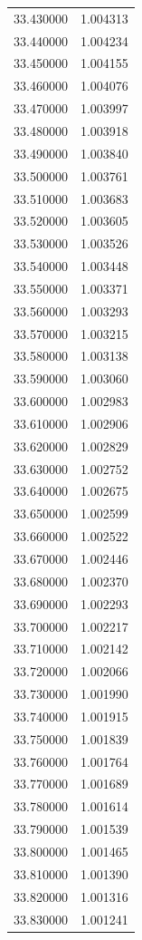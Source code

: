 \begin{tabular}{rr}
33.430000 & 1.004313 \\
33.440000 & 1.004234 \\
33.450000 & 1.004155 \\
33.460000 & 1.004076 \\
33.470000 & 1.003997 \\
33.480000 & 1.003918 \\
33.490000 & 1.003840 \\
33.500000 & 1.003761 \\
33.510000 & 1.003683 \\
33.520000 & 1.003605 \\
33.530000 & 1.003526 \\
33.540000 & 1.003448 \\
33.550000 & 1.003371 \\
33.560000 & 1.003293 \\
33.570000 & 1.003215 \\
33.580000 & 1.003138 \\
33.590000 & 1.003060 \\
33.600000 & 1.002983 \\
33.610000 & 1.002906 \\
33.620000 & 1.002829 \\
33.630000 & 1.002752 \\
33.640000 & 1.002675 \\
33.650000 & 1.002599 \\
33.660000 & 1.002522 \\
33.670000 & 1.002446 \\
33.680000 & 1.002370 \\
33.690000 & 1.002293 \\
33.700000 & 1.002217 \\
33.710000 & 1.002142 \\
33.720000 & 1.002066 \\
33.730000 & 1.001990 \\
33.740000 & 1.001915 \\
33.750000 & 1.001839 \\
33.760000 & 1.001764 \\
33.770000 & 1.001689 \\
33.780000 & 1.001614 \\
33.790000 & 1.001539 \\
33.800000 & 1.001465 \\
33.810000 & 1.001390 \\
33.820000 & 1.001316 \\
33.830000 & 1.001241 \\

\end{tabular}
